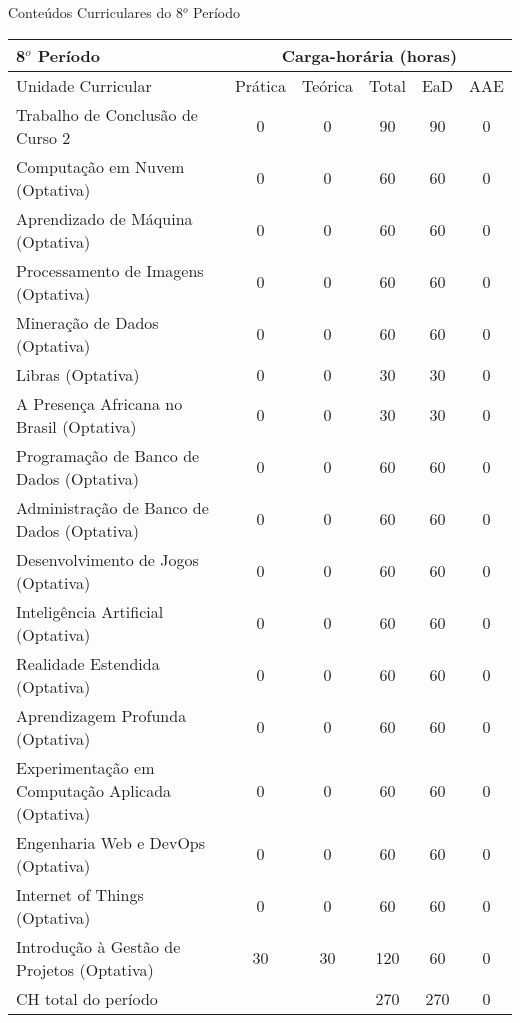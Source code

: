 \begin{quadro}[ht!]
\centering
\caption{Conteúdos Curriculares do 8$^o$ Período}\label{qua:periodo8}
\begin{tabular}{|p{8.0cm}|c|c|c|c|c|}
\hline
\rowcolor{blue1} 8$^o$ Período & \multicolumn{5}{|c|}{\centering Carga-horária (horas)} \\ \hline
\rowcolor{blue1} Unidade Curricular & Prática & Teórica & Total & EaD & AAE \\ \hline
Trabalho de Conclusão de Curso 2 & 0 & 0 & 90 & 90	&	0 \\	\hline
Computação em Nuvem (Optativa) & 0 & 0 & 60 & 60	&	0 \\	\hline
Aprendizado de Máquina (Optativa) & 0 & 0 & 60 & 60	&	0 \\	\hline
Processamento de Imagens (Optativa) & 0 & 0 & 60 & 60	&	0 \\	\hline
Mineração de Dados (Optativa) & 0 & 0 & 60 & 60	&	0 \\	\hline
Libras (Optativa) & 0 & 0 & 30 & 30	&	0 \\	\hline
A Presença Africana no Brasil (Optativa) & 0 & 0 & 30 & 30	&	0 \\	\hline
Programação de Banco de Dados (Optativa) & 0 & 0 & 60 & 60	&	0 \\	\hline
Administração de Banco de Dados (Optativa) & 0 & 0 & 60 & 60	&	0 \\	\hline
Desenvolvimento de Jogos (Optativa) & 0 & 0 & 60 & 60	&	0 \\	\hline
Inteligência Artificial (Optativa) & 0 & 0 & 60 & 60	&	0 \\	\hline
Realidade Estendida (Optativa) & 0 & 0 & 60 & 60	&	0 \\	\hline
Aprendizagem Profunda (Optativa) & 0 & 0 & 60 & 60	&	0 \\	\hline
Experimentação em Computação Aplicada (Optativa) & 0 & 0 & 60 & 60	&	0 \\	\hline
Engenharia Web e DevOps (Optativa) & 0 & 0 & 60 & 60	&	0 \\	\hline
Internet of Things (Optativa) & 0 & 0 & 60 & 60	&	0 \\	\hline
Introdução à Gestão de Projetos (Optativa) & 30 & 30 & 120 & 60	&	0 \\	\hline
CH total do período & \multicolumn{2}{p{3.3cm}|}{\cellcolor{blue1}} & 270 & 270	&	0 \\ \hline
\end{tabular} \end{quadro}